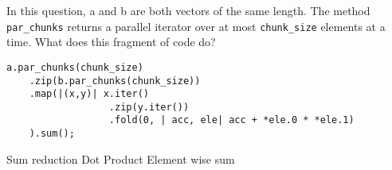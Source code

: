 %
%
In this question, a and b are both vectors of the same length. The method \texttt{par\_chunks} returns a parallel iterator over at most \texttt{chunk\_size} elements at a time. What does this fragment of code do?
\begin{lstlisting}
a.par_chunks(chunk_size)
    .zip(b.par_chunks(chunk_size))
    .map(|(x,y)| x.iter()
                  .zip(y.iter())
                  .fold(0, | acc, ele| acc + *ele.0 * *ele.1)
    ).sum();

\end{lstlisting}

\choice Sum reduction
\choice Dot Product
\choice Element wise sum



